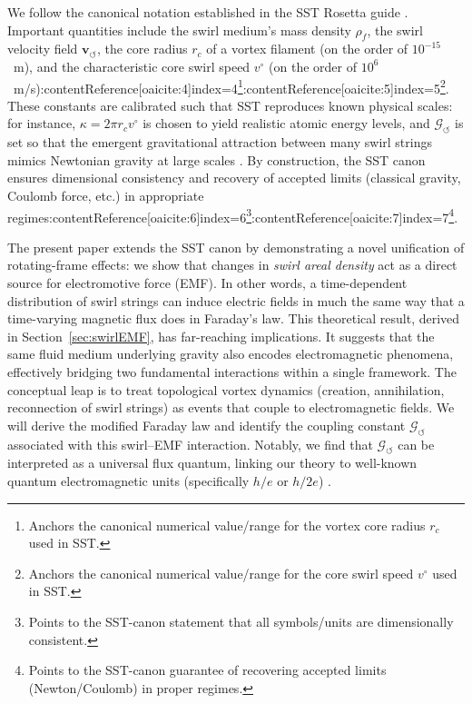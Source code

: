 \documentclass[12pt]{article}
\begin{document}
    We follow the canonical notation established in the SST Rosetta guide \cite{Iskandarani2025Rosetta,Iskandarani2025Canon}. Important quantities include the swirl medium's mass density $\rho_{\!f}$, the swirl velocity field $\mathbf{v}_{\!\boldsymbol{\circlearrowleft}}$, the core radius $r_c$ of a vortex filament (on the order of $10^{-15}$~m), and the characteristic core swirl speed $v^{\circ}$ (on the order of $10^{6}$~m/s):contentReference[oaicite:4]{index=4}\footnote{Anchors the canonical numerical value/range for the vortex core radius $r_c$ used in SST.}:contentReference[oaicite:5]{index=5}\footnote{Anchors the canonical numerical value/range for the core swirl speed $v^{\circ}$ used in SST.}. These constants are calibrated such that SST reproduces known physical scales: for instance, $\kappa = 2\pi r_c v^{\circ}$ is chosen to yield realistic atomic energy levels, and $\mathcal{G}_{\!\boldsymbol{\circlearrowleft}}$ is set so that the emergent gravitational attraction between many swirl strings mimics Newtonian gravity at large scales \cite{Iskandarani2025Canon}. By construction, the SST canon ensures dimensional consistency and recovery of accepted limits (classical gravity, Coulomb force, etc.) in appropriate regimes:contentReference[oaicite:6]{index=6}\footnote{Points to the SST-canon statement that all symbols/units are dimensionally consistent.}:contentReference[oaicite:7]{index=7}\footnote{Points to the SST-canon guarantee of recovering accepted limits (Newton/Coulomb) in proper regimes.}.

    The present paper extends the SST canon by demonstrating a novel unification of rotating-frame effects: we show that changes in \emph{swirl areal density} act as a direct source for electromotive force (EMF). In other words, a time-dependent distribution of swirl strings can induce electric fields in much the same way that a time-varying magnetic flux does in Faraday's law. This theoretical result, derived in Section~\ref{sec:swirlEMF}, has far-reaching implications. It suggests that the same fluid medium underlying gravity also encodes electromagnetic phenomena, effectively bridging two fundamental interactions within a single framework. The conceptual leap is to treat topological vortex dynamics (creation, annihilation, reconnection of swirl strings) as events that couple to electromagnetic fields. We will derive the modified Faraday law and identify the coupling constant $\mathcal{G}_{\!\boldsymbol{\circlearrowleft}}$ associated with this swirl–EMF interaction. Notably, we find that $\mathcal{G}_{\!\boldsymbol{\circlearrowleft}}$ can be interpreted as a universal flux quantum, linking our theory to well-known quantum electromagnetic units (specifically $h/e$ or $h/2e$) \cite{Deaver1961,Doll1961}.
\end{document}
